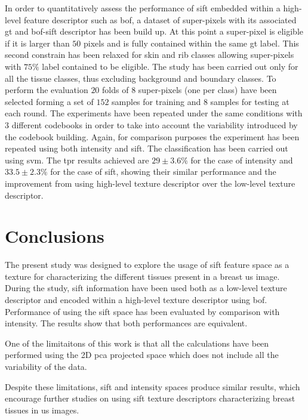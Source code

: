 \documentclass[a4paper, 10pt, conference]{llncs}      %
\begin{document}
In order to quantitatively assess the performance of \ac{sift} embedded within a high-level feature descriptor such as \ac{bof}, a dataset of super-pixels with its associated \ac{gt} and \ac{bof}-\ac{sift} descriptor has been build up.
At this point a super-pixel is eligible if it is larger than $50$ pixels and is fully contained within the same \ac{gt} label. 
 This second constrain has been relaxed for skin and rib classes allowing super-pixels with $75\%$ label contained to be eligible. The study has been carried out only for all the tissue classes, thus excluding background and boundary classes. To perform the evaluation $20$ folds of $8$ super-pixels (one per class) have been selected forming a set of $152$ samples for training and $8$ samples for testing at each round. The experiments have been repeated under the same conditions with $3$ different codebooks in order to take into account the variability introduced by the codebook building. 
 Again, for comparison purposes the experiment has been repeated using both intensity and \ac{sift}. The classification has been carried out using \ac{svm}. The \ac{tpr} results achieved are $29\pm3.6\%$ for the case of intensity and $33.5\pm2.3\%$ for the case of \ac{sift}, showing their similar performance and the improvement from using high-level texture descriptor over the low-level texture descriptor.

\vspace{-10pt}
\section{Conclusions} 
The present study was designed to explore the usage of \ac{sift} feature space as a texture for characterizing the different tissues present in a breast \ac{us} image. During the study, \ac{sift} information have been used both as a low-level texture descriptor and encoded within a high-level texture descriptor using \ac{bof}.
Performance of using the \ac{sift} space has been evaluated by comparison with intensity. The results show that both performances are equivalent.

One of the limitaitons of this work is that all the calculations have been performed using the 2D \ac{pca} projected space which does not include all the variability of the data.

Despite these limitations, \ac{sift} and intensity spaces produce similar results, which encourage further studies on using \ac{sift} texture descriptors characterizing breast tissues in \ac{us} images.


%


\end{document}
